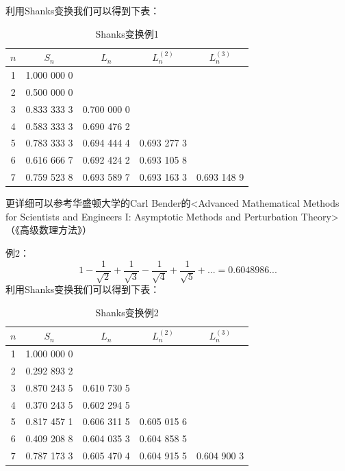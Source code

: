 利用Shanks变换我们可以得到下表：
\begin{table}
	\centering
	\begin{tabular}{c|c|c|c|c}
		   $n$   &    $S_n$    &     $L_n$     &  $L_n^{(2)}$  &  $L_n^{(3)}$  \\
	    	\hline
		    1    & 1.000 000 0 &               &               &               \\
		    2    & 0.500 000 0 &               &               &               \\
		    3    & 0.833 333 3 &  0.700 000 0  &               &               \\
		    4    & 0.583 333 3 &  0.690 476 2  &               &               \\
		    5    & 0.783 333 3 &  0.694 444 4  &  0.693 277 3  &               \\
		    6    & 0.616 666 7 &  0.692 424 2  &  0.693 105 8  &               \\
		    7    & 0.759 523 8 &  0.693 589 7  &  0.693 163 3  &  0.693 148 9  \\
	\end{tabular}
	\caption{Shanks变换例1}
\end{table}

更详细可以参考华盛顿大学的Carl Bender的<Advanced Mathematical Methods for Scientists and Engineers I: Asymptotic Methods and Perturbation Theory>（《高级数理方法》）

例2：
\[1-\frac{1}{\sqrt{2}}+\frac{1}{\sqrt{3}}-\frac{1}{\sqrt{4}}+\frac{1}{\sqrt{5}}+... = 0.6048986...\]
利用Shanks变换我们可以得到下表：
\begin{table}
	\centering
	\begin{tabular}{c|c|c|c|c}
		$n$   &    $S_n$    &     $L_n$     &  $L_n^{(2)}$  &  $L_n^{(3)}$  \\
		\hline
		1    & 1.000 000 0 &               &               &               \\
		2    & 0.292 893 2 &               &               &               \\
		3    & 0.870 243 5 &  0.610 730 5  &               &               \\
		4    & 0.370 243 5 &  0.602 294 5  &               &               \\
		5    & 0.817 457 1 &  0.606 311 5  &  0.605 015 6  &               \\
		6    & 0.409 208 8 &  0.604 035 3  &  0.604 858 5  &               \\
		7    & 0.787 173 3 &  0.605 470 4  &  0.604 915 5  &  0.604 900 3  \\
	\end{tabular}
	\caption{Shanks变换例2}
\end{table}

